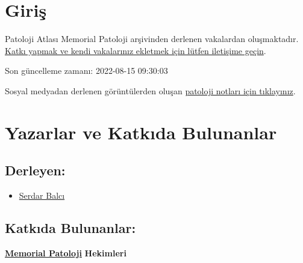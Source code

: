 \documentclass[
  letterpaper,
  DIV=11,
  numbers=noendperiod]{scrreprt}
\providecommand{\tightlist}{%
  \setlength{\itemsep}{0pt}\setlength{\parskip}{0pt}}\usepackage{longtable,booktabs,array}
\begin{document}
\hypertarget{giris}{%
\chapter*{Giriş}\label{giris}}

Patoloji Atlası Memorial Patoloji arşivinden derlenen vakalardan
oluşmaktadır.\\

\href{https://www.patolojiatlasi.com/katki.html}{Katkı yapmak ve kendi
vakalarınız ekletmek için lütfen iletişime geçin}.

Son güncelleme zamanı: 2022-08-15 09:30:03

Sosyal medyadan derlenen görüntülerden oluşan
\href{https://www.patolojinotlari.com/}{patoloji notları için
tıklayınız}.


\hypertarget{yazarlar-ve-katkux131da-bulunanlar}{%
\chapter*{Yazarlar ve Katkıda
Bulunanlar}\label{yazarlar-ve-katkux131da-bulunanlar}}

\hypertarget{derleyen}{%
\section*{Derleyen:}\label{derleyen}}

\begin{itemize}
\tightlist
\item
  \href{https://www.serdarbalci.com}{Serdar Balcı}
\end{itemize}

\hypertarget{katkux131da-bulunanlar}{%
\section*{Katkıda Bulunanlar:}\label{katkux131da-bulunanlar}}

\href{https://patoloji.memorial.com.tr/}{\textbf{Memorial Patoloji}}
\textbf{Hekimleri}
\end{document}
